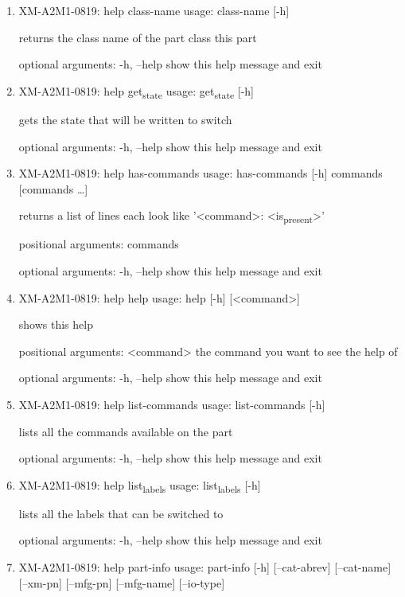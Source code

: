 \documentclass[11pt]{article}
\begin{document}
\begin{enumerate}
\item XM-A2M1-0819: help class-name
\label{sec:org492a8f5}
usage: class-name [-h]

returns the class name of the part class this part

optional arguments:
  -h, --help  show this help message and exit

\item XM-A2M1-0819: help get\textsubscript{state}
\label{sec:org74a725b}
usage: get\textsubscript{state} [-h]

gets the state that will be written to switch

optional arguments:
  -h, --help  show this help message and exit

\item XM-A2M1-0819: help has-commands
\label{sec:org1ba969c}
usage: has-commands [-h] commands [commands \ldots{}]

returns a list of lines each look like '<command>: <is\textsubscript{present}>'

positional arguments:
  commands

optional arguments:
  -h, --help  show this help message and exit

\item XM-A2M1-0819: help help
\label{sec:orged8e3e5}
usage: help [-h] [<command>]

shows this help

positional arguments:
  <command>   the command you want to see the help of

optional arguments:
  -h, --help  show this help message and exit

\item XM-A2M1-0819: help list-commands
\label{sec:org317f04c}
usage: list-commands [-h]

lists all the commands available on the part

optional arguments:
  -h, --help  show this help message and exit

\item XM-A2M1-0819: help list\textsubscript{labels}
\label{sec:org46121d0}
usage: list\textsubscript{labels} [-h]

lists all the labels that can be switched to

optional arguments:
  -h, --help  show this help message and exit

\item XM-A2M1-0819: help part-info
\label{sec:org97c31d5}
usage: part-info  [-h] [--cat-abrev] [--cat-name] [--xm-pn] [--mfg-pn] [--mfg-name]
        [--io-type]


\end{enumerate}
\end{document}

